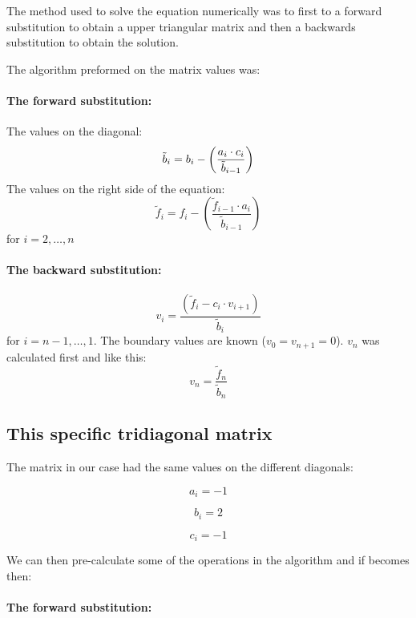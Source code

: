 The method used to solve the equation numerically was to first to a forward substitution to obtain a upper triangular matrix and then a backwards substitution to obtain the solution.

The algorithm preformed on the matrix values was:

\paragraph{The forward substitution:\hspace{4cm}}

\hspace{1cm}\linebreak
The values on the diagonal:
\[
\tilde{b}_i =  b_i - \left(\frac{a_i \cdot c_i}{\tilde{b}_{i-1}}\right)\linebreak
\]
The values on the right side of the equation:
\[
\tilde{f}_i =  f_i - \left(\frac{\tilde{f}_{i-1} \cdot a_i}{\tilde{b}_{i-1}}\right)
\]
for $i = 2, \dots, n $

\paragraph{The backward substitution:\hspace{4cm}}

\hspace{1cm}\linebreak
\[
v_i = \frac{\left(\tilde{f}_i - c_i\cdot v_{i+1}\right)}{\tilde{b}_i}
\]
for $i = n-1, \dots, 1 $. The boundary values are known ($v_0 = v_{n+1} = 0$). $v_{n}$ was calculated first and like this:
\[
v_{n} = \frac{\tilde{f}_{n}}{\tilde{b}_{n}}
\]

\subsection{This specific tridiagonal matrix}

The matrix in our case had the same values on the different diagonals:
\begin{multicols}{3}

\[
a_i = -1
\]

\[
b_i = 2
\]

\[
c_i = -1
\]

\end{multicols}

We can then pre-calculate some of the operations in the algorithm and if becomes then:

\paragraph{The forward substitution:\hspace{4cm}}


